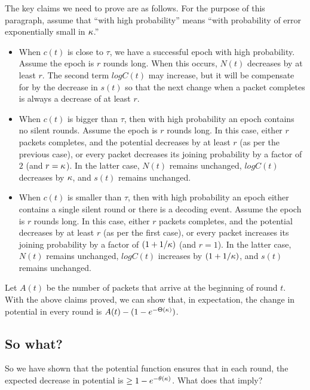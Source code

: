 The key claims we need to prove are as follows.  For the purpose of this paragraph, assume that ``with high probability'' means ``with probability of error exponentially small in $\kappa$.''
\begin{itemize}
    \item When $c(t)$ is close to $\tau$, we have a successful epoch with high probability.  Assume the epoch is $r$ rounds long.  When this occurs, $N(t)$ decreases by at least $r$.  The second term $logC(t)$ may increase, but it will be compensate for by the decrease in $s(t)$ so that the next change when a packet completes is always a decrease of at least $r$.
    \item When $c(t)$ is bigger than $\tau$, then with high probability an epoch contains no silent rounds.  Assume the epoch is $r$ rounds long.  In this case, either $r$ packets completes, and the potential decreases by at least $r$ (as per the previous case), or every packet decreases its joining probability by a factor of $2$ (and $r = \kappa$).  In the latter case, $N(t)$ remains unchanged, $logC(t)$ decreases by $\kappa$, and $s(t)$ remains unchanged.
    \item When $c(t)$ is smaller than $\tau$, then with high probability an epoch either contains a single silent round or there is a decoding event.  Assume the epoch is $r$ rounds long.  In this case, either $r$ packets completes, and the potential decreases by at least $r$ (as per the first case), or every packet increases its joining probability by a factor of $(1 + 1/\kappa)$ (and $r = 1$).  In the latter case, $N(t)$ remains unchanged, $logC(t)$ increases by $(1 + 1/\kappa)$, and $s(t)$ remains unchanged.
\end{itemize}

Let $A(t)$ be the number of packets that arrive at the beginning of round $t$.  With the above claims proved, we can show that, in expectation, the change in potential in every round is $A(t) - (1 - e^{-\Theta(\kappa)})$.

\subsection{So what?}

So we have shown that the potential function ensures that in each round, the expected decrease in potential is $\geq 1 - e^{-\theta(\kappa)}$.  What does that imply?

